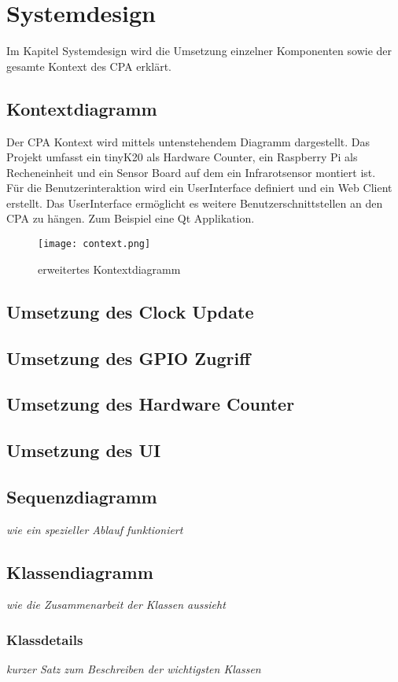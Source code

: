 \section{Systemdesign}
    Im Kapitel Systemdesign wird die Umsetzung einzelner Komponenten sowie der gesamte Kontext des CPA erklärt.
        \subsection{Kontextdiagramm}
        Der CPA Kontext wird mittels untenstehendem Diagramm dargestellt. Das Projekt umfasst ein tinyK20 als Hardware Counter, ein Raspberry Pi als Recheneinheit und ein Sensor Board auf dem ein Infrarotsensor montiert ist.\\
        Für die Benutzerinteraktion wird ein UserInterface definiert und ein Web Client erstellt. Das UserInterface ermöglicht es weitere Benutzerschnittstellen an den CPA zu hängen. Zum Beispiel eine Qt Applikation.
        \begin{figure}[H]
            \centering
            \texttt{[image: context.png]}
            \caption{erweitertes Kontextdiagramm}
        \end{figure}

    	\subsection{Umsetzung des Clock Update}
		\subsection{Umsetzung des GPIO Zugriff}
		\subsection{Umsetzung des Hardware Counter}
        
        \subsection{Umsetzung des UI}
		\subsection{Sequenzdiagramm}
			\textit{wie ein spezieller Ablauf funktioniert}
		\subsection{Klassendiagramm}
			\textit{wie die Zusammenarbeit der Klassen aussieht}
			\subsubsection{Klassdetails}
				\textit{kurzer Satz zum Beschreiben der wichtigsten Klassen}